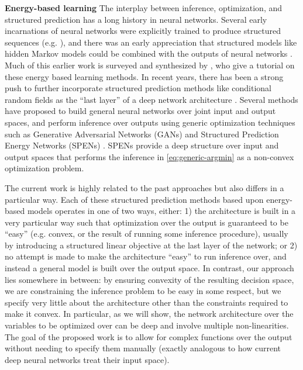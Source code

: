 \textbf{Energy-based learning}
The interplay between inference, optimization, and structured prediction
has a long history in neural networks.
Several early incarnations of neural networks were explicitly trained
to produce structured sequences (e.g. \citet{simard1991reverse}),
and there was an early appreciation that structured models like hidden Markov
models could be combined with the outputs of neural networks
\citep{bengio-lecun-henderson-94}.  Much of this earlier work is surveyed and
synthesized by \citet{lecun2006tutorial}, who give a tutorial on these energy
based learning
methods.
In recent years, there has been a strong push to further incorporate
structured prediction methods like conditional random fields as the ``last
layer'' of a deep network architecture
\citep{peng2009conditional,zheng2015conditional,chen2015learning}.
Several methods have proposed to build general neural networks over joint input
and output spaces, and perform inference over outputs using generic optimization
techniques such as Generative Adversarial Networks (GANs) \citep{goodfellow2014generative}
and Structured Prediction Energy Networks (SPENs) \citep{belanger2016structured}.
SPENs provide a deep structure over input and output spaces
that performs the inference in \cref{eq:generic-argmin} as
a non-convex optimization problem.

The current work is highly related to the past approaches
but also differs in a particular way.
Each of these structured prediction methods based upon energy-based
models operates in one of two ways, either:
1) the architecture is built in a very particular way such that
optimization over the output is guaranteed to be ``easy'' (e.g. convex, or the
result of running some inference procedure), usually by introducing a
structured linear objective at the last layer of the network; or 2) no attempt
is made to make the architecture ``easy'' to run inference over, and instead a
general model is built over the output space.
In contrast, our approach lies somewhere in between:
by ensuring convexity of the resulting decision space, we are constraining
the inference problem to be easy in some respect, but we specify very
little about the architecture other than the constraints required to make
it convex.
In particular, as we will show, the network architecture over the
variables to be optimized over can be deep and involve multiple
non-linearities.  The goal of the proposed work is to allow
for complex functions over the output without needing to specify them manually
(exactly analogous to how current deep neural networks treat their input space).

